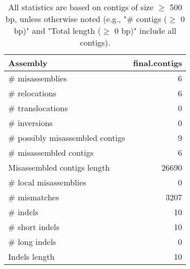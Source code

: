 \documentclass[12pt,a4paper]{article}
\begin{document}
\begin{table}[ht]
\begin{center}
\caption{All statistics are based on contigs of size $\geq$ 500 bp, unless otherwise noted (e.g., "\# contigs ($\geq$ 0 bp)" and "Total length ($\geq$ 0 bp)" include all contigs).}
\begin{tabular}{|l*{1}{|r}|}
\hline
Assembly & final.contigs \\ \hline
\# misassemblies & 6 \\ \hline
\hspace{5mm}\# relocations & 6 \\ \hline
\hspace{5mm}\# translocations & 0 \\ \hline
\hspace{5mm}\# inversions & 0 \\ \hline
\# possibly misassembled contigs & 9 \\ \hline
\# misassembled contigs & 6 \\ \hline
Misassembled contigs length & 26690 \\ \hline
\# local misassemblies & 0 \\ \hline
\# mismatches & 3207 \\ \hline
\# indels & 10 \\ \hline
\hspace{5mm}\# short indels & 10 \\ \hline
\hspace{5mm}\# long indels & 0 \\ \hline
Indels length & 10 \\ \hline
\end{tabular}
\end{center}
\end{table}
\end{document}
